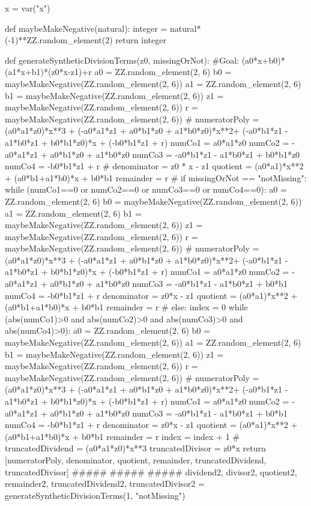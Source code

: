 \documentclass{ximera}
\begin{document}
\begin{sagesilent}
x = var("x")
 
def maybeMakeNegative(natural):
    integer = natural*(-1)**ZZ.random_element(2)
    return integer
 
def generateSyntheticDivisionTerms(z0, missingOrNot):
    #Goal: (a0*x+b0)*(a1*x+b1)*(z0*x-z1)+r
    a0 = ZZ.random_element(2, 6)
    b0 = maybeMakeNegative(ZZ.random_element(2, 6))
    a1 = ZZ.random_element(2, 6)
    b1 = maybeMakeNegative(ZZ.random_element(2, 6))
    z1 = maybeMakeNegative(ZZ.random_element(2, 6))
    r = maybeMakeNegative(ZZ.random_element(2, 6))
    #
    numeratorPoly = (a0*a1*z0)*x**3 + (-a0*a1*z1 + a0*b1*z0 + a1*b0*z0)*x**2+ (-a0*b1*z1 - a1*b0*z1 + b0*b1*z0)*x + (-b0*b1*z1 + r)
    numCo1 = a0*a1*z0
    numCo2 = -a0*a1*z1 + a0*b1*z0 + a1*b0*z0
    numCo3 = -a0*b1*z1 - a1*b0*z1 + b0*b1*z0
    numCo4 = -b0*b1*z1 + r
    #
    denominator = z0 * x - z1
    quotient = (a0*a1)*x**2 + (a0*b1+a1*b0)*x + b0*b1
    remainder = r
    #
    if missingOrNot == "notMissing":
        while (numCo1==0 or numCo2==0 or numCo3==0 or numCo4==0):
            a0 = ZZ.random_element(2, 6)
            b0 = maybeMakeNegative(ZZ.random_element(2, 6))
            a1 = ZZ.random_element(2, 6)
            b1 = maybeMakeNegative(ZZ.random_element(2, 6))
            z1 = maybeMakeNegative(ZZ.random_element(2, 6))
            r = maybeMakeNegative(ZZ.random_element(2, 6))
            #
            numeratorPoly = (a0*a1*z0)*x**3 + (-a0*a1*z1 + a0*b1*z0 + a1*b0*z0)*x**2+ (-a0*b1*z1 - a1*b0*z1 + b0*b1*z0)*x + (-b0*b1*z1 + r)
            numCo1 = a0*a1*z0
            numCo2 = -a0*a1*z1 + a0*b1*z0 + a1*b0*z0
            numCo3 = -a0*b1*z1 - a1*b0*z1 + b0*b1
            numCo4 = -b0*b1*z1 + r
            denominator = z0*x - z1
            quotient = (a0*a1)*x**2 + (a0*b1+a1*b0)*x + b0*b1
            remainder = r
            #
    else:
        index =  0
        while (abs(numCo1)>0 and abs(numCo2)>0 and abs(numCo3)>0 and abs(numCo4)>0):
            a0 = ZZ.random_element(2, 6)
            b0 = maybeMakeNegative(ZZ.random_element(2, 6))
            a1 = ZZ.random_element(2, 6)
            b1 = maybeMakeNegative(ZZ.random_element(2, 6))
            z1 = maybeMakeNegative(ZZ.random_element(2, 6))
            r = maybeMakeNegative(ZZ.random_element(2, 6))
            #
            numeratorPoly = (a0*a1*z0)*x**3 + (-a0*a1*z1 + a0*b1*z0 + a1*b0*z0)*x**2+ (-a0*b1*z1 - a1*b0*z1 + b0*b1*z0)*x + (-b0*b1*z1 + r)
            numCo1 = a0*a1*z0
            numCo2 = -a0*a1*z1 + a0*b1*z0 + a1*b0*z0
            numCo3 = -a0*b1*z1 - a1*b0*z1 + b0*b1
            numCo4 = -b0*b1*z1 + r
            denominator = z0*x - z1
            quotient = (a0*a1)*x**2 + (a0*b1+a1*b0)*x + b0*b1
            remainder = r
            index =  index + 1
            #
    truncatedDividend = (a0*a1*z0)*x**3
    truncatedDivisor = z0*x
    return [numeratorPoly, denominator, quotient, remainder, truncatedDividend, truncatedDivisor]
#####
#####
#####
dividend2, divisor2, quotient2, remainder2, truncatedDividend2, truncatedDivisor2 = generateSyntheticDivisionTerms(1, "notMissing")
 

\end{sagesilent}
\end{document}
